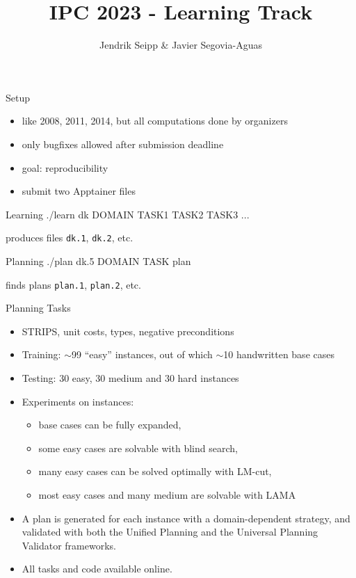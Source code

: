 \documentclass[aspectratio=169,xcolor=dvipsnames]{beamer}
\title[short title]{IPC 2023 - Learning Track} %
\author[Allauthors] {Jendrik Seipp \& Javier Segovia-Aguas}
\date{} %
\begin{document}
\begin{frame}
    \titlepage
\end{frame}

\begin{frame}{Setup}
    \begin{itemize}
        \item like 2008, 2011, 2014, but all computations done by organizers
        \item only bugfixes allowed after submission deadline
        \item goal: reproducibility
        \item submit two Apptainer files
    \end{itemize}

    \begin{block}{Learning}
        ./learn dk DOMAIN TASK1 TASK2 TASK3 ...
    \end{block}

    produces files \texttt{dk.1}, \texttt{dk.2}, etc.

    \begin{exampleblock}{Planning}
        ./plan dk.5 DOMAIN TASK plan
    \end{exampleblock}

    finds plans \texttt{plan.1}, \texttt{plan.2}, etc.
\end{frame}

\begin{frame}{Planning Tasks}
    \begin{itemize}
        \item STRIPS, unit costs, types, negative preconditions
        \item Training: $\sim$99 ``easy'' instances, out of which $\sim$10 handwritten base cases
        \item Testing: 30 easy, 30 medium and 30 hard instances
        \item Experiments on instances:
        \begin{itemize}
            \item base cases can be fully expanded,
            \item some easy cases are solvable with blind search,
            \item many easy cases can be solved optimally with LM-cut,
            \item most easy cases and many medium are solvable with LAMA
        \end{itemize}
        \item A plan is generated for each instance with a domain-dependent strategy, and validated with both the Unified Planning and the Universal Planning Validator frameworks.
        \item All tasks and code available online.
    \end{itemize}
\end{frame}
\end{document}
